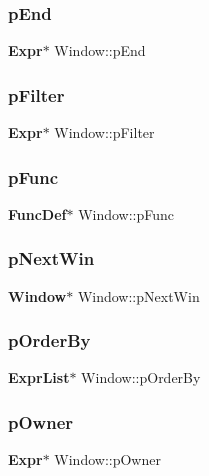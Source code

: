 \subsubsection{pEnd}
{\footnotesize\ttfamily \textbf{ Expr}$\ast$ Window\+::p\+End}

\mbox{\label{struct_window_a7ff037d3e68c0caf5305699f589e0914}} 
\subsubsection{pFilter}
{\footnotesize\ttfamily \textbf{ Expr}$\ast$ Window\+::p\+Filter}

\mbox{\label{struct_window_a3663997d05cc5170e043eb31d7c1117c}} 
\subsubsection{pFunc}
{\footnotesize\ttfamily \textbf{ Func\+Def}$\ast$ Window\+::p\+Func}

\mbox{\label{struct_window_a7c7d7aeeac56664e876b2302ec095a52}} 
\subsubsection{pNextWin}
{\footnotesize\ttfamily \textbf{ Window}$\ast$ Window\+::p\+Next\+Win}

\mbox{\label{struct_window_abc09116c44a911a364127db676dcc1f6}} 
\subsubsection{pOrderBy}
{\footnotesize\ttfamily \textbf{ Expr\+List}$\ast$ Window\+::p\+Order\+By}

\mbox{\label{struct_window_a45112514899f27553cc2d69028eb52e7}} 
\subsubsection{pOwner}
{\footnotesize\ttfamily \textbf{ Expr}$\ast$ Window\+::p\+Owner}

\mbox{\label{struct_window_a023feba794a2344fdd86a3b8fa86e5fe}} 
